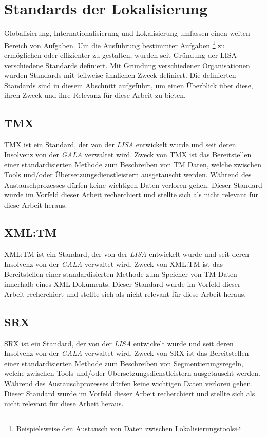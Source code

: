 \section{Standards der Lokalisierung}
Globalisierung, Internationalisierung und Lokalisierung umfassen einen weiten Bereich von Aufgaben. Um die Ausführung bestimmter Aufgaben 
\footnote{Beispielsweise den Austausch von Daten zwischen Lokalisierungstools}
zu ermöglichen oder effizienter zu gestalten, wurden seit Gründung der \ac{LISA} verschiedene Standards definiert. Mit Gründung verschiedener Organisationen wurden Standards mit teilweise ähnlichen Zweck definiert. Die definierten Standards sind in diesem Abschnitt aufgeführt, um einen Überblick über diese, ihren Zweck und ihre Relevanz für diese Arbeit zu bieten.
\subsection{TMX}
\ac{TMX} ist ein Standard, der von der \textit{\ac{LISA}} entwickelt wurde und seit deren Insolvenz von der \textit{\ac{GALA}} verwaltet wird. Zweck von \ac{TMX} ist das Bereitstellen einer standardisierten Methode zum Beschreiben von \ac{TM} Daten, welche zwischen Tools und/oder Übersetzungsdienstleistern ausgetauscht werden. Während des Austauschprozesses dürfen keine wichtigen Daten verloren gehen. Dieser Standard wurde im Vorfeld dieser Arbeit recherchiert und stellte sich als nicht relevant für diese Arbeit heraus.
\autocite[Vgl.][]{Savourel.2005}
\subsection{XML:TM}
\ac{XML:TM} ist ein Standard, der von der \textit{\ac{LISA}} entwickelt wurde und seit deren Insolvenz von der \textit{\ac{GALA}} verwaltet wird. Zweck von \ac{XML:TM} ist das Bereitstellen einer standardisierten Methode zum Speicher von \ac{TM} Daten innerhalb eines \ac{XML}-Dokuments. Dieser Standard wurde im Vorfeld dieser Arbeit recherchiert und stellte sich als nicht relevant für diese Arbeit heraus.
\autocite[Vgl.][]{Zydron.2007b}
\subsection{SRX}
\ac{SRX} ist ein Standard, der von der \textit{\ac{LISA}} entwickelt wurde und seit deren Insolvenz von der \textit{\ac{GALA}} verwaltet wird. Zweck von \ac{SRX} ist das Bereitstellen einer standardisierten Methode zum Beschreiben von Segmentierungsregeln, welche zwischen Tools und/oder Übersetzungsdienstleistern ausgetauscht werden. Während des Austauschprozesses dürfen keine wichtigen Daten verloren gehen. Dieser Standard wurde im Vorfeld dieser Arbeit recherchiert und stellte sich als nicht relevant für diese Arbeit heraus.
\autocite[Vgl.][]{Pooley.2008}
